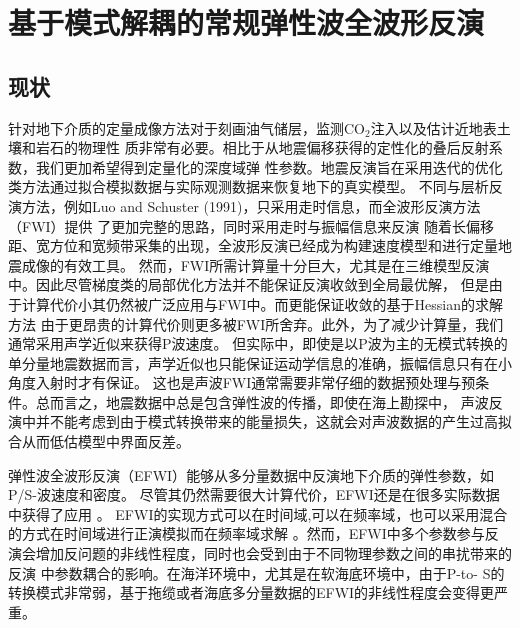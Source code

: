 



\chapter{基于模式解耦的常规弹性波全波形反演}
\label{cha:MD-EFWI}
\section{现状}
针对地下介质的定量成像方法对于刻画油气储层，监测CO$_2$注入以及估计近地表土壤和岩石的物理性
质非常有必要。相比于从地震偏移获得的定性化的叠后反射系数，我们更加希望得到定量化的深度域弹
性参数。地震反演旨在采用迭代的优化类方法通过拟合模拟数据与实际观测数据来恢复地下的真实模型。
不同与层析反演方法，例如Luo and Schuster (1991)\citep{luo1991}，只采用走时信息，而全波形反演方法（FWI）提供
了更加完整的思路，同时采用走时与振幅信息来反演\cite[]{tarantola:1986}
随着长偏移距、宽方位和宽频带采集的出现，全波形反演已经成为构建速度模型和进行定量地震成像的有效工具\cite{virieux2009overview}。
然而，FWI所需计算量十分巨大，尤其是在三维模型反演中。因此尽管梯度类的局部优化方法并不能保证反演收敛到全局最优解，
但是由于计算代价小其仍然被广泛应用与FWI中。而更能保证收敛的基于Hessian的求解方法\cite{mora:1987,crase1990robust}
由于更昂贵的计算代价则更多被FWI所舍弃。此外，为了减少计算量，我们通常采用声学近似来获得P波速度\cite{ravaut2004multiscale,operto2006crustal}。
但实际中，即使是以P波为主的无模式转换的单分量地震数据而言，声学近似也只能保证运动学信息的准确，振幅信息只有在小角度入射时才有保证。
这也是声波FWI通常需要非常仔细的数据预处理与预条件。总而言之，地震数据中总是包含弹性波的传播，即使在海上勘探中，
声波反演中并不能考虑到由于模式转换带来的能量损失，这就会对声波数据的产生过高拟合从而低估模型中界面反差。

弹性波全波形反演（EFWI）\cite{tarantola:1986}能够从多分量数据中反演地下介质的弹性参数，如P/S-波速度和密度。
尽管其仍然需要很大计算代价，EFWI还是在很多实际数据中获得了应用
\cite{crase1992nonlinear,djikpesse.tarantola:1999,sears:2008,sears:2010,prieux:2013a,prieux:2013b,vigh:2014}。
EFWI的实现方式可以在时间域\cite{shipp:2002},可以在频率域\cite{brossier2009}，也可以采用混合的方式在时间域进行正演模拟而在频率域求解
\cite{nihei.li:2007,sirgue:2008}。然而，EFWI中多个参数参与反演会增加反问题的非线性程度，同时也会受到由于不同物理参数之间的串扰带来的反演
中参数耦合的影响\cite{forgues.lambare:1997}。在海洋环境中，尤其是在软海底环境中，由于P-to-
S的转换模式非常弱，基于拖缆或者海底多分量数据的EFWI的非线性程度会变得更严重\cite{sears:2008}。

